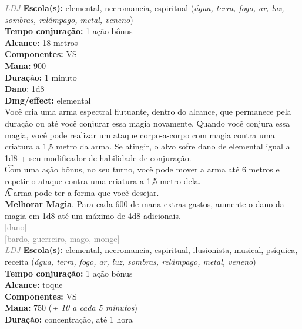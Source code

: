 \documentclass{RPG_Adventure}[2021/10/20]
\begin{document}
{\tiny \textcolor{gray}{\textit{LDJ}}}\jump{}
{\small \t \textbf{Escola(s):} elemental, necromancia, espiritual (\textit{água, terra, fogo, ar, luz, sombras, relâmpago, metal, veneno})\\\t \textbf{Tempo conjuração:} 1 ação bônus\\\t \textbf{Alcance:} 18 metros\\\t \textbf{Componentes:} VS\\\t \textbf{Mana:} 900\\\t \textbf{Duração:} 1 minuto\\\t \textbf{Dano}: 1d8\\\t \textbf{Dmg/effect:} elemental\\}
{\normalsize Você cria uma arma espectral flutuante, dentro do alcance, que permanece pela duração ou até você conjurar essa magia novamente. Quando você conjura essa magia, você pode realizar um ataque corpo-a-corpo com magia contra uma criatura a 1,5 metro da arma. Se atingir, o alvo sofre dano de elemental igual a 1d8 + seu modificador de habilidade de conjuração.\\\t Com uma ação bônus, no seu turno, você pode mover a arma até 6 metros e repetir o ataque contra uma criatura a 1,5 metro dela.\\\t A arma pode ter a forma que você desejar.\\\t \textbf{Melhorar Magia}. Para cada 600 de mana extras gastos, aumente o dano da magia em 1d8 até um máximo de 4d8 adicionais.\\}
{\scriptsize \textcolor{gray}{[dano]\\}}
{\scriptsize \textcolor{gray}{[bardo, guerreiro, mago, monge]\\}}
{\tiny \textcolor{gray}{\textit{LDJ}}}\jump{}
{\small \t \textbf{Escola(s):} elemental, necromancia, espiritual, ilusionista, musical, psíquica, receita (\textit{água, terra, fogo, ar, luz, sombras, relâmpago, metal, veneno})\\\t \textbf{Tempo conjuração:} 1 ação bônus\\\t \textbf{Alcance:} toque\\\t \textbf{Componentes:} VS\\\t \textbf{Mana:} 750 (\textit{+ 10 a cada 5 minutos})\\\t \textbf{Duração:} concentração, até 1 hora\\}
\end{document}

